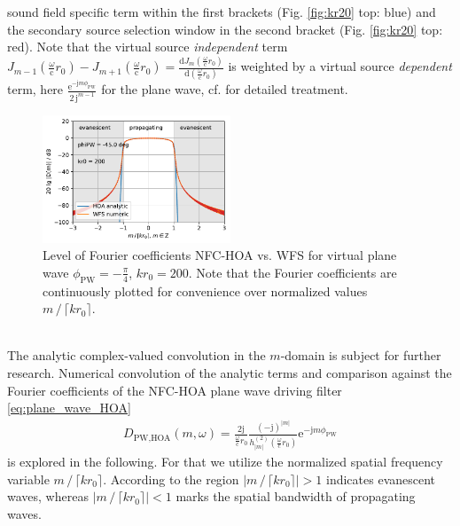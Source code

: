 \documentclass[a4paper, 10pt, twocolumn]{article}
\def\NewL{\\\noindent\hspace*{3mm}}
\begin{document}
sound field specific term within the first brackets (Fig. \ref{fig:kr20} top: blue) and the secondary source selection window
in the second bracket (Fig. \ref{fig:kr20} top: red). Note that the virtual source \textit{independent} term
 $J_{m-1}(\frac{\omega}{\mathrm{c}} r_0) - J_{m+1}(\frac{\omega}{\mathrm{c}} r_0) = \frac{\mathrm{d} J_{m}(\frac{\omega}{\mathrm{c}} r_0)}{\mathrm{d} (\frac{\omega}{\mathrm{c}} r_0)}$
\cite[(10.6.1)]{NIST}
is weighted by a virtual source \textit{dependent} term, here
 $\frac{\mathrm{e}^{- \mathrm{j} m \phi_\text{PW}}}{2\,\mathrm{j}^{m-1}}$ for the plane wave,
 cf. \cite{Hahn2016} for detailed treatment.
%
%
%
\begin{figure}[b!]
\includegraphics[width=0.5\textwidth]{nfc_hoa_vs_WFS_drivingfunctions_plot_PW_kr200_single_dB.pdf}
\caption{Level of Fourier coefficients NFC-HOA vs. WFS for virtual plane wave $\phi_\text{PW}=-\frac{\pi}{4}$, $kr_0=200$.
Note that the Fourier coefficients are continuously plotted for convenience over normalized values $m \, / \, \lceil k r_0 \rceil$.
}
\label{fig:kr200}
\end{figure}
%
%
%
\NewL The analytic complex-valued convolution in the $m$-domain is subject for further research.
Numerical convolution of the analytic terms and comparison against the 
Fourier coefficients of the NFC-HOA plane wave driving filter \eqref{eq:plane_wave_HOA}
\begin{align}
D_{\text{PW,HOA}}(m,\omega) = \frac{2 \mathrm{j}}{\frac{\omega}{\mathrm{c}} r_0} \frac{(-\mathrm{j})^{|m|}}{h_{|m|}^{(2)}(\frac{\omega}{\mathrm{c}} r_0)} \mathrm{e}^{-\mathrm{j} m \phi_\text{PW}}
\end{align}
is explored in the following.
For that we utilize the normalized spatial frequency variable $m \, / \, \lceil k r_0 \rceil$.
According to \cite[Sec. 2.2]{AhrensBook} the region
$|m \, / \, \lceil k r_0 \rceil|>1$ indicates evanescent waves, whereas
$|m \, / \, \lceil k r_0 \rceil|<1$ marks the spatial bandwidth of propagating waves.
\end{document}

